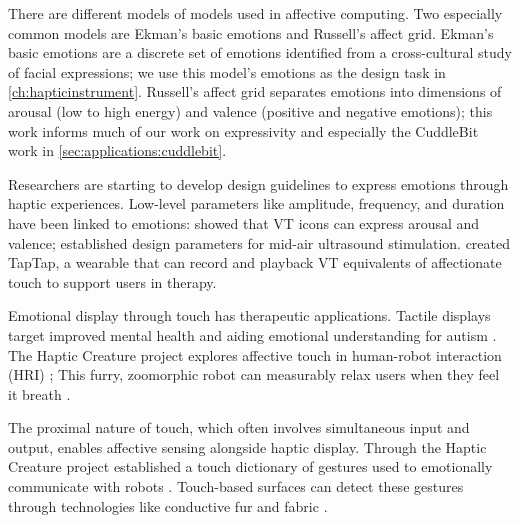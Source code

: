 There are different models of models used in affective computing.
Two especially common models are Ekman's basic emotions and Russell's affect grid.
Ekman's basic emotions \cite{Ekman1992,Ekman1971} are a discrete set of emotions identified from a cross-cultural study of facial expressions; we use this model's emotions as the design task in \autoref{ch:hapticinstrument}.
Russell's affect grid \cite{Russell1989circumplexmodel,Russell1989affectgrid} separates emotions into dimensions of arousal (low to high energy) and valence (positive and negative emotions); this work informs much of our work on expressivity and especially the CuddleBit work in \autoref{sec:applications:cuddlebit}.

Researchers are starting to develop design guidelines to express emotions through haptic experiences.
Low-level parameters like amplitude, frequency, and duration have been linked to emotions: \citet{YongjaeYoo2015} showed that VT icons can express arousal and valence;
\citet{Obrist2015} established design parameters for mid-air ultrasound stimulation.
\citet{Bonanni2006} created TapTap, a wearable that can record and playback VT equivalents of affectionate touch to support users in therapy.

Emotional display through touch has therapeutic applications.
Tactile displays target improved mental health \cite{Vaucelle2009} and aiding emotional understanding for autism \cite{Changeon2012}.
The Haptic Creature project explores affective touch in human-robot interaction (HRI) \cite{Yohanan2005,Yohanan2009,Yohanan2011affectivetouch,Yohanan2011affectdisplay};
This furry, zoomorphic robot can measurably relax users when they feel it breath \cite{Sefidgar2016}.


The proximal nature of touch, which often involves simultaneous input and output, enables affective sensing alongside haptic display.
Through the Haptic Creature project established a touch dictionary of gestures used to emotionally communicate with robots \cite{Yohanan2011affectivetouch}.
Touch-based surfaces can detect these gestures \cite{Flagg2013} through technologies like conductive fur and fabric \cite{Flagg2012}.





